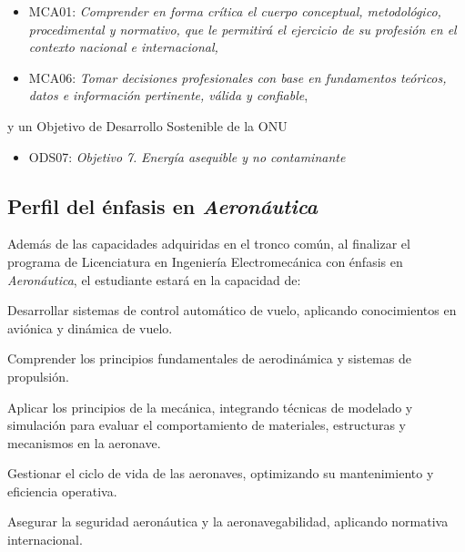 \begin{itemize}
\item MCA01: \textit{Comprender en forma crítica el cuerpo conceptual, metodológico, procedimental y normativo, que le permitirá el ejercicio de su profesión en el contexto nacional e internacional,}
\item MCA06: \textit{Tomar decisiones profesionales con base en fundamentos teóricos, datos e información pertinente, válida y confiable},
\end{itemize}
y un Objetivo de Desarrollo Sostenible de la ONU\par

\begin{itemize}
\item ODS07: \textit{Objetivo }\textit{7}\textit{. }\textit{Energía asequible y no contaminante}
\end{itemize}
\subsection*{Perfil del énfasis en \textit{Aeronáutica}}

Además de las capacidades adquiridas en el tronco común, al finalizar el programa de Licenciatura en Ingeniería Electromecánica con énfasis en \textit{Aeronáutica}, el estudiante estará en la capacidad de:\par

\begin{cuadroazul}[AER01]
Desarrollar sistemas de control automático de vuelo, aplicando conocimientos en aviónica y dinámica de vuelo.
\end{cuadroazul}

\begin{cuadroazul}[AER02]
Comprender los principios fundamentales de aerodinámica y sistemas de propulsión.
\end{cuadroazul}

\begin{cuadroazul}[AER03]
Aplicar los principios de la mecánica, integrando técnicas de modelado y simulación para evaluar el comportamiento de materiales, estructuras y mecanismos en la aeronave.
\end{cuadroazul}

\begin{cuadroazul}[AER04]
Gestionar el ciclo de vida de las aeronaves, optimizando su mantenimiento y eficiencia operativa.
\end{cuadroazul}

\begin{cuadroazul}[AER05]
Asegurar la seguridad aeronáutica y la aeronavegabilidad, aplicando normativa internacional.
\end{cuadroazul}

